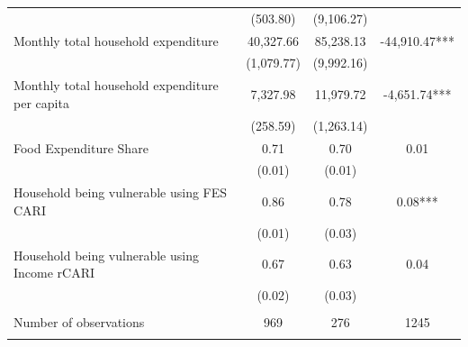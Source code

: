\begin{tabular}{@{\extracolsep{5pt}}lccc}
 & (503.80)  & (9,106.27)  &  \\ [1ex]
Monthly total household expenditure   & 40,327.66    & 85,238.13    & -44,910.47***   \\
 & (1,079.77)  & (9,992.16)  &  \\ [1ex]
Monthly total household expenditure per capita   & 7,327.98    & 11,979.72    & -4,651.74***   \\
 & (258.59)  & (1,263.14)  &  \\ [1ex]
Food Expenditure Share   & 0.71    & 0.70    & 0.01   \\
 & (0.01)  & (0.01)  &  \\ [1ex]
Household being vulnerable using FES CARI   & 0.86    & 0.78    & 0.08***   \\
 & (0.01)  & (0.03)  &  \\ [1ex]
Household being vulnerable using Income rCARI   & 0.67    & 0.63    & 0.04   \\
 & (0.02)  & (0.03)  &  \\ [1ex]
\hline \\[-1.8ex]
Number of observations  & 969   & 276  & 1245  \\
\hline \hline \\[-1.8ex]

\end{tabular}
